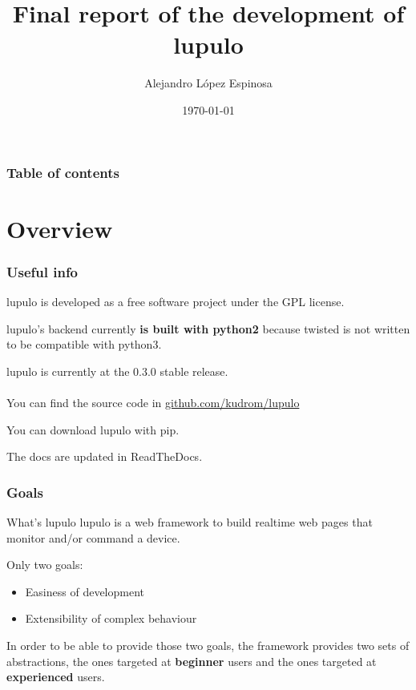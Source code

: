 \documentclass{beamer}
\title[Final report of lupulo]{Final report of the development of \textbf{lupulo}}
\author{Alejandro López Espinosa}
\institute[VIVES university]
{
    VIVES University
    \medskip
}
\date{\today}
\begin{document}
    \begin{frame}
    \titlepage
    \end{frame}

    \begin{frame}
        \frametitle{Table of contents}
        \tableofcontents
    \end{frame}

    \section{Overview}
    \begin{frame}
        \frametitle{Useful info}
        lupulo is developed as a free software project under the GPL
        license.

        lupulo's backend currently \textbf{is built with python2} because
        twisted is not written to be compatible with python3.

        lupulo is currently at the 0.3.0 stable release.
        \\~\\

        You can find the source code in 
        \textcolor{orange}{\href{http://github.com/kudrom/lupulo}{github.com/kudrom/lupulo}}

        You can download lupulo with pip.

        The docs are updated in ReadTheDocs.
    \end{frame}

    \begin{frame}
        \frametitle{Goals}

        \begin{block}{What's lupulo}
            lupulo is a web framework to build realtime web pages that monitor
            and/or command a device.
        \end{block}

        Only two goals:
        \begin{itemize}
            \item Easiness of development
            \item Extensibility of complex behaviour
        \end{itemize}

        In order to be able to provide those two goals, the framework provides
        two sets of abstractions, the ones targeted at \textbf{beginner} users
        and the ones targeted at \textbf{experienced} users.
    \end{frame}
\end{document}
